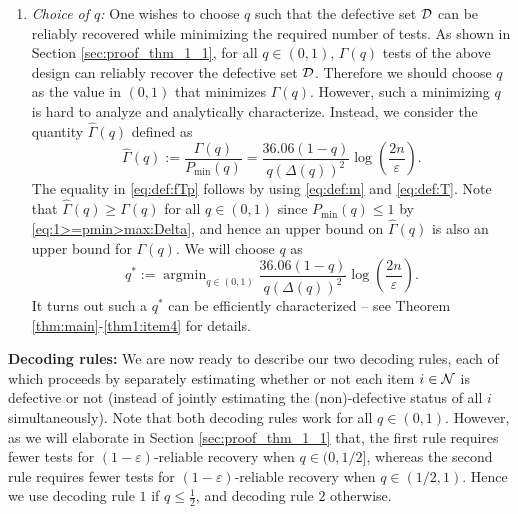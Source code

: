 \documentclass[onecolumn,letterpaper]{IEEEtran}
\DeclareMathOperator*{\argmin}{argmin}
\newcommand{\cN}{{\cal N}}
\newcommand{\cD}{{\cal D}}
\newcommand{\cp}{{q}}
\newcommand{\nt}{{m}}
\newcommand{\mo}{{s}}
\newcommand{\pmin}{{P_{\min}(\cp)}}
\newcommand{\pgap}{{\Delta(\cp)}}
\newcommand{\cpn}{{\cp^*}}
\newcommand{\sid}[1]{\textcolor{red}{#1}}
\newcommand{\ftau}{{\Gamma}}
\newcommand{\ftaup}{{\hat{\Gamma}}}
\newcommand{\fT}{{\ftau(\cp)}}
\newcommand{\fTp}{\ftaup (\cp)}
\newcommand{\cpb}{\hat{\cp}}
\newcommand{\xw}[1]{\textcolor{cyan}{#1}}
\begin{document}
\begin{enumerate}
\item {\it Choice of $\cp$:} One wishes to choose $\cp$ such that the defective set $\cD$ can be reliably recovered while minimizing the required number of tests. As shown in Section \ref{sec:proof_thm_1_1}, for all $\cp\in(0,1)$, $\fT$ tests of the above design can reliably recover the defective set $\cD$. Therefore we should choose $\cp$ as the value in $ (0,1)$ that minimizes $\fT$.
However, such a minimizing $\cp$ is hard to analyze and analytically characterize. Instead, we consider the quantity $\fTp$ defined as
\begin{equation}
\label{eq:def:fTp}
    \fTp := \frac{\fT}{\pmin}  = \frac{36.06(1-\cp)}{\cp (\pgap)^2} \log \left( \frac{2n}{\varepsilon} \right).
\end{equation}
The equality in \eqref{eq:def:fTp} follows by using \eqref{eq:def:m} and \eqref{eq:def:T}.
Note that $\fTp \ge \fT$ for all $\cp \in (0,1)$ since $\pmin \le 1$ by \eqref{eq:1>=pmin>max:Delta}, and hence an upper bound on $\fTp$ is also an upper bound for $\fT$. We will choose $\cp$ as
\begin{equation} \label{eq:def:cpn}
    \cpn := \argmin_{\cp\in(0,1)} \frac{36.06(1-\cp)}{\cp (\pgap)^2} \log \left( \frac{2n}{\varepsilon} \right).
\end{equation}
It turns out such a $\cpn$ can be efficiently characterized -- see Theorem \ref{thm:main}-\ref{thm1:item4} for details.
\end{enumerate}	



{\bf Decoding rules:} We are now ready to describe our two decoding rules, each of which proceeds by separately estimating whether or not each item $i\in\cN$ is defective or not (instead of jointly estimating the (non)-defective status of all $i$ simultaneously).
Note that both decoding rules work for all $\cp \in (0,1)$. However, as we will elaborate in Section \ref{sec:proof_thm_1_1} that, the first rule requires fewer tests for $(1-\varepsilon)$-reliable recovery when $\cp \in (0,1/2]$, whereas the second rule requires fewer tests for $(1-\varepsilon)$-reliable recovery when $\cp \in (1/2,1)$. Hence we use decoding rule $1$ if $\cp\leq \frac 1 2$, and  decoding rule $2$ otherwise.
\end{document}
